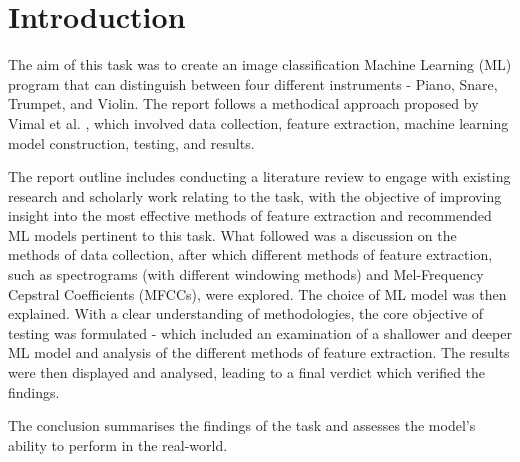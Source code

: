 \section{Introduction}

The aim of this task was to create an image classification Machine Learning (ML) program that can distinguish between four different instruments - Piano, Snare, Trumpet, and Violin. The report follows a methodical approach proposed by Vimal et al. \cite{Vimal_2021}, which involved data collection, feature extraction, machine learning model construction, testing, and results.

The report outline includes conducting a literature review to engage with existing research and scholarly work relating to the task, with the objective of improving insight into the most effective methods of feature extraction and recommended ML models pertinent to this task. What followed was a discussion on the methods of data collection, after which different methods of feature extraction, such as spectrograms (with different windowing methods) and Mel-Frequency Cepstral Coefficients (MFCCs), were explored. The choice of ML model was then explained. With a clear understanding of methodologies, the core objective of testing was formulated - which included an examination of a shallower and deeper ML model and analysis of the different methods of feature extraction. The results were then displayed and analysed, leading to a final verdict which verified the findings. 

The conclusion summarises the findings of the task and assesses the model's ability to perform in the real-world.